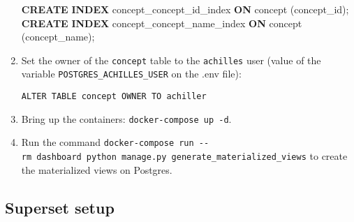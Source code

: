 \documentclass[
]{book}
\newenvironment{Shaded}{\begin{snugshade}}{\end{snugshade}}
\newcommand{\KeywordTok}[1]{\textcolor[rgb]{0.13,0.29,0.53}{\textbf{#1}}}
\newcommand{\NormalTok}[1]{#1}
\begin{document}
\begin{enumerate}
\begin{Shaded}
\begin{Highlighting}[]
\KeywordTok{CREATE} \KeywordTok{INDEX}\NormalTok{ concept\_concept\_id\_index }\KeywordTok{ON}\NormalTok{ concept (concept\_id);}
\KeywordTok{CREATE} \KeywordTok{INDEX}\NormalTok{ concept\_concept\_name\_index }\KeywordTok{ON}\NormalTok{ concept (concept\_name);}
\end{Highlighting}
\end{Shaded}
\item
  Set the owner of the \texttt{concept} table to the \texttt{achilles} user (value of the variable \texttt{POSTGRES\_ACHILLES\_USER} on the .env file):

\begin{verbatim}
ALTER TABLE concept OWNER TO achiller
\end{verbatim}
\item
  Bring up the containers: \texttt{docker-compose\ up\ -d}.
\item
  Run the command \texttt{docker-compose\ run\ -\/-rm\ dashboard\ python\ manage.py\ generate\_materialized\_views} to create the materialized views on Postgres.
\end{enumerate}

\hypertarget{superset-setup}{%
\subsection*{Superset setup}\label{superset-setup}}
\end{document}
